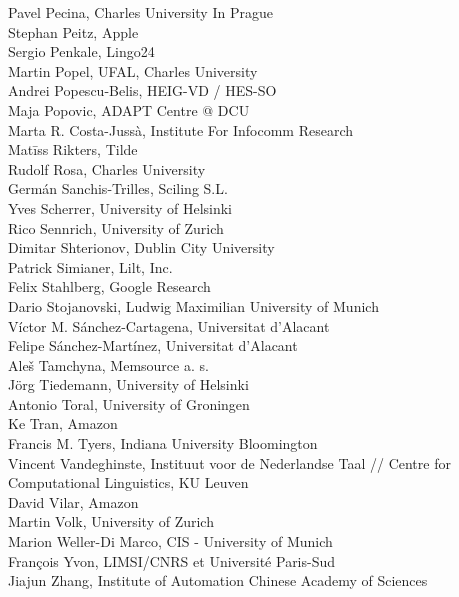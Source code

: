 \documentclass[a4paper,11pt,twoside]{book}
\begin{document}
\noindent Pavel Pecina, Charles University In Prague\\
\noindent Stephan Peitz, Apple\\
\noindent Sergio Penkale, Lingo24\\
\noindent Martin Popel, UFAL, Charles University\\
\noindent Andrei Popescu-Belis, HEIG-VD / HES-SO\\
\noindent Maja Popovic, ADAPT Centre @ DCU\\
\noindent Marta R. Costa-Jussà, Institute For Infocomm Research\\
\noindent Matīss Rikters, Tilde\\
\noindent Rudolf Rosa, Charles University\\
\noindent Germán Sanchis-Trilles, Sciling S.L.\\
\noindent Yves Scherrer, University of Helsinki\\
\noindent Rico Sennrich, University of Zurich\\
\noindent Dimitar Shterionov, Dublin City University\\
\noindent Patrick Simianer, Lilt, Inc.\\
\noindent Felix Stahlberg, Google Research\\
\noindent Dario Stojanovski, Ludwig Maximilian University of Munich\\
\noindent Víctor M. Sánchez-Cartagena, Universitat d'Alacant\\
\noindent Felipe Sánchez-Martínez, Universitat d'Alacant\\
\noindent Aleš Tamchyna, Memsource a. s.\\
\noindent Jörg Tiedemann, University of Helsinki\\
\noindent Antonio Toral, University of Groningen\\
\noindent Ke Tran, Amazon\\
\noindent Francis M. Tyers, Indiana University Bloomington\\
\noindent Vincent Vandeghinste, Instituut voor de Nederlandse Taal // Centre for Computational Linguistics, KU Leuven\\
\noindent David Vilar, Amazon\\
\noindent Martin Volk, University of Zurich\\
\noindent Marion Weller-Di Marco, CIS - University of Munich\\
\noindent François Yvon, LIMSI/CNRS et Université Paris-Sud\\
\noindent Jiajun Zhang, Institute of Automation Chinese Academy of Sciences
\end{document}
